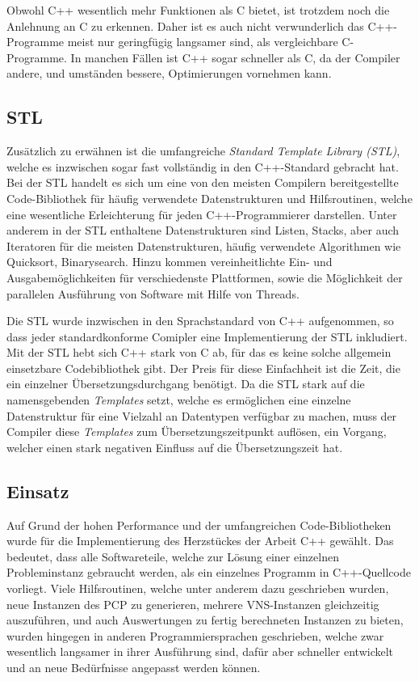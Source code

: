Obwohl C++ wesentlich mehr Funktionen als C bietet, ist trotzdem noch die Anlehnung an C zu erkennen. Daher ist es auch nicht verwunderlich das C++-Programme meist nur geringfügig langsamer sind, als 
vergleichbare C-Programme. In manchen Fällen ist C++ sogar schneller als C, da der Compiler andere, und umständen bessere, Optimierungen vornehmen kann. 

\subsection{STL}
\label{sec:stl}
Zusätzlich zu erwähnen ist die umfangreiche \textit{Standard Template Library (STL)}, welche es inzwischen sogar fast vollständig in den 
C++-Standard gebracht hat. Bei der STL handelt es sich um eine von den meisten Compilern bereitgestellte Code-Bibliothek für häufig 
verwendete Datenstrukturen und Hilfsroutinen, welche eine wesentliche Erleichterung für jeden C++-Programmierer darstellen. Unter anderem
in der STL enthaltene Datenstrukturen sind Listen, Stacks, aber auch Iteratoren für die meisten Datenstrukturen, häufig verwendete Algorithmen
wie Quicksort, Binarysearch. Hinzu kommen vereinheitlichte Ein- und Ausgabemöglichkeiten für verschiedenste Plattformen, sowie die 
Möglichkeit der parallelen Ausführung von Software mit Hilfe von Threads.

Die STL wurde inzwischen in den Sprachstandard von C++ aufgenommen, so dass jeder standardkonforme Comipler eine Implementierung der STL inkludiert. Mit der STL hebt sich C++ stark von C ab, für 
das es keine solche allgemein einsetzbare Codebibliothek gibt. Der Preis für diese Einfachheit ist die Zeit, die ein einzelner Übersetzungsdurchgang benötigt. Da die STL stark auf die namensgebenden
\textit{Templates} setzt, welche es ermöglichen eine einzelne Datenstruktur für eine Vielzahl an Datentypen verfügbar zu machen, muss der Compiler diese \textit{Templates} zum Übersetzungszeitpunkt
auflösen, ein Vorgang, welcher einen stark negativen Einfluss auf die Übersetzungszeit hat.

\subsection{Einsatz}
Auf Grund der hohen Performance und der umfangreichen Code-Bibliotheken wurde für die Implementierung des Herzstückes der Arbeit C++ gewählt. Das bedeutet, dass alle Softwareteile, welche zur Lösung einer
einzelnen Probleminstanz gebraucht werden, als ein einzelnes Programm in C++-Quellcode vorliegt. Viele Hilfsroutinen, welche unter anderem dazu geschrieben wurden, neue Instanzen des PCP zu generieren, 
mehrere VNS-Instanzen gleichzeitig auszuführen, und auch Auswertungen zu fertig berechneten Instanzen zu bieten, wurden hingegen in anderen Programmiersprachen geschrieben, welche zwar wesentlich langsamer
in ihrer Ausführung sind, dafür aber schneller entwickelt und an neue Bedürfnisse angepasst werden können.

